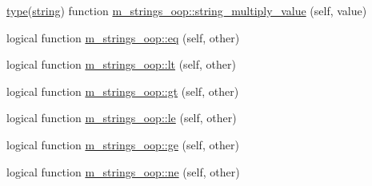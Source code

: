 \begin{DoxyCompactItemize}
\item 
\hyperlink{stop__watch_83_8txt_a70f0ead91c32e25323c03265aa302c1c}{type}(\hyperlink{what__overview_81_8txt_a74cb7e955273b9f9157b4f0c18a38849}{string}) function \hyperlink{namespacem__strings__oop_a9624f1e09be383f993e7c0e94b230deb}{m\+\_\+strings\+\_\+oop\+::string\+\_\+multiply\+\_\+value} (self, value)
\item 
logical function \hyperlink{namespacem__strings__oop_a2e5c8d9117609e553db07a1eba18b1fa}{m\+\_\+strings\+\_\+oop\+::eq} (self, other)
\item 
logical function \hyperlink{namespacem__strings__oop_a332288f9bebc563e12671b514512eb30}{m\+\_\+strings\+\_\+oop\+::lt} (self, other)
\item 
logical function \hyperlink{namespacem__strings__oop_a25beb184587d7c9fc0a3fd846d4ce187}{m\+\_\+strings\+\_\+oop\+::gt} (self, other)
\item 
logical function \hyperlink{namespacem__strings__oop_a103e7c1fab92a1c4cbfff87ec8cd1e23}{m\+\_\+strings\+\_\+oop\+::le} (self, other)
\item 
logical function \hyperlink{namespacem__strings__oop_a2d31ec44898046ba97aebc0de32de19a}{m\+\_\+strings\+\_\+oop\+::ge} (self, other)
\item 
logical function \hyperlink{namespacem__strings__oop_aa424e1eccc45bb143172d6e212f8e408}{m\+\_\+strings\+\_\+oop\+::ne} (self, other)
\end{DoxyCompactItemize}

